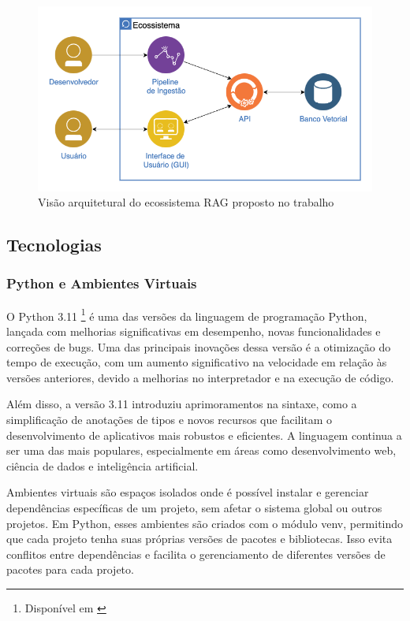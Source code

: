 \documentclass[a4paper, 12pt]{article}
\newcommand{\citeb}[1]{\bibleftbracket\cite{#1}\bibrightbracket}
\begin{document}
    \begin{figure}[h]
        \includegraphics[width=\textwidth,height=0.9\textheight,keepaspectratio]{ecosystem.png}
        \centering
        \caption{Visão arquitetural do ecossistema RAG proposto no trabalho}
        \centering
        \label{fig:ecosystem}
    \end{figure}

    \clearpage

    \subsection{Tecnologias} \label{sec:technologies}

    \subsubsection{Python e Ambientes Virtuais} \label{sec:python}
    
    O Python 3.11 \footnote{Disponível em \citeb{python}} é uma das versões da linguagem de programação Python, lançada com melhorias significativas em desempenho, novas funcionalidades e correções de bugs. Uma das principais inovações dessa versão é a otimização do tempo de execução, com um aumento significativo na velocidade em relação às versões anteriores, devido a melhorias no interpretador e na execução de código. 
    
    Além disso, a versão 3.11 introduziu aprimoramentos na sintaxe, como a simplificação de anotações de tipos e novos recursos que facilitam o desenvolvimento de aplicativos mais robustos e eficientes. A linguagem continua a ser uma das mais populares, especialmente em áreas como desenvolvimento web, ciência de dados e inteligência artificial.
    
    Ambientes virtuais são espaços isolados onde é possível instalar e gerenciar dependências específicas de um projeto, sem afetar o sistema global ou outros projetos. Em Python, esses ambientes são criados com o módulo venv, permitindo que cada projeto tenha suas próprias versões de pacotes e bibliotecas. Isso evita conflitos entre dependências e facilita o gerenciamento de diferentes versões de pacotes para cada projeto.
\end{document}
